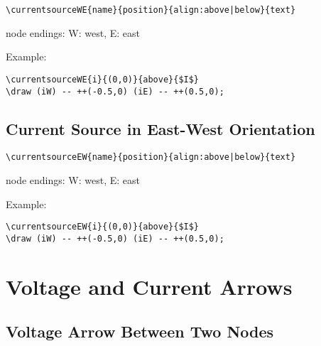 \documentclass[parskip=full]{scrartcl}
\begin{document}
\begin{verbatim}
\currentsourceWE{name}{position}{align:above|below}{text}
\end{verbatim}
node endings: W: west, E: east

Example:\\
\begin{minipage}{0.8\textwidth}
\begin{verbatim}
\currentsourceWE{i}{(0,0)}{above}{$I$}
\draw (iW) -- ++(-0.5,0) (iE) -- ++(0.5,0);
\end{verbatim}
\end{minipage}
\begin{minipage}{0.19\textwidth}
\end{minipage}

\subsection{Current Source in East-West Orientation}

\begin{verbatim}
\currentsourceEW{name}{position}{align:above|below}{text}
\end{verbatim}
node endings: W: west, E: east

Example:\\
\begin{minipage}{0.8\textwidth}
\begin{verbatim}
\currentsourceEW{i}{(0,0)}{above}{$I$}
\draw (iW) -- ++(-0.5,0) (iE) -- ++(0.5,0);
\end{verbatim}
\end{minipage}
\begin{minipage}{0.19\textwidth}
\end{minipage}

\section{Voltage and Current Arrows}

\subsection{Voltage Arrow Between Two Nodes}
\end{document}
